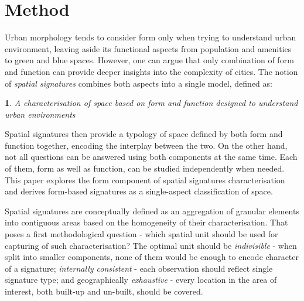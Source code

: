\section{Method}
\label{sec:meth}

Urban morphology tends to consider form only when trying to understand urban
environment, leaving aside its functional aspects from population and amenities to green
and blue spaces. However, one can argue that only combination of form and function can
provide deeper insights into the complexity of cities. The notion of \textit{spatial
signatures} combines both aspects into a single model, defined as:

\newtheorem*{theorem}{}
\begin{theorem}
    A characterisation of space based on form and function designed to understand urban
environments
\end{theorem}

Spatial signatures then provide a typology of space defined by both form and function
together, encoding the interplay between the two. On the other hand, not all questions
can be answered using both components at the same time. Each of them, form as well as
function, can be studied independently when needed. This paper explores the form component
of spatial signatures characterisation and derives form-based signatures as a
single-aspect classification of space.

Spatial signatures are conceptually defined as an aggregation of granular elements into
contiguous areas based on the homogeneity of their characterisation. That poses a first
methodological question - which spatial unit should be used for capturing of such
characterisation? The optimal unit should be \textit{indivisible} - when split into
smaller components, none of them would be enough to encode character of a signature;
\textit{internally consistent} - each observation should reflect single signature type;
and geographically \textit{exhaustive} - every location in the area of interest, both
built-up and un-built, should be covered.

